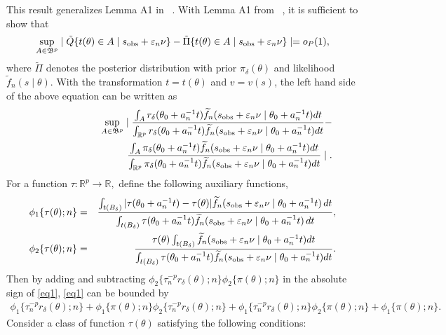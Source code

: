\documentclass[9pt]{article}
\theoremstyle{remark}
\begin{document}
	This result generalizes Lemma A1 in ~\cite{Li2017}. With Lemma A1 from ~\cite{Li2017}, it is sufficient to show that 
	\[
	\sup_{A\in\mathfrak{B}^{p}}\mid\tilde{Q}\{t(\theta)\in A\mid s_{\rm obs}+\varepsilon_{n}\nu\}-\tilde{\Pi}\{t(\theta)\in A\mid s_{\rm obs}+\varepsilon_{n}\nu\}\mid=o_{P}(1),
	\]
	where $\tilde{\Pi}$ denotes the posterior distribution with prior $\pi_{\delta}(\theta)$ and likelihood $\tilde{f}_n(s \mid \theta)$. 
With the transformation $t=t(\theta)$
	and $v=v(s)$, the left hand side of the above equation can be written
	as 
	\begin{eqnarray}
	&&\sup_{A\in\mathfrak{B}^{p}}\mid\frac{\int_{A}r_{\delta}(\theta_0+a_{n}^{-1}t)\ftil_{n}(s_{{\rm obs}}+\veps_{n}\nu\mid\theta_0+a_{n}^{-1}t)dt}{\int_{\mathbb{R}^{p}}r_{\delta}(\theta_0+a_{n}^{-1}t)\ftil_{n}(s_{{\rm obs}}+\veps_{n}\nu\mid\theta_0+a_{n}^{-1}t)dt}-\hfill  \label{eq1} \\
	&&\hspace{3cm}\frac{\int_{A}\pi_{\delta}(\theta_0+a_{n}^{-1}t)\ftil_{n}(s_{{\rm obs}}+\veps_{n}\nu\mid\theta_0+a_{n}^{-1}t)dt}{\int_{\mathbb{R}^{p}}\pi_{\delta}(\theta_0+a_{n}^{-1}t)\ftil_{n}(s_{{\rm obs}}+\veps_{n}\nu\mid\theta_0+a_{n}^{-1}t)dt}\mid. \notag 
	\end{eqnarray}
	For a function $\tau:\mathbb{R}^{p}\rightarrow\mathbb{R},$ define
	the following auxiliary functions,
	\begin{eqnarray*}
		\phi_{1}\{\tau(\theta);n\} & = & \frac{\int_{t(B_{\delta})}|\tau(\theta_0+a_{n}^{-1}t)-\tau(\theta)|\widetilde{f}_{n}(s_{{\rm obs}}+\varepsilon_{n}\nu\mid\theta_0+a_{n}^{-1}t)\,dt}{\int_{t(B_{\delta})}\tau(\theta_0+a_{n}^{-1}t)\widetilde{f}_{n}(s_{{\rm obs}}+\varepsilon_{n}\nu\mid\theta_0+a_{n}^{-1}t)\,dt},\\
		\phi_{2}\{\tau(\theta);n\} & = & \frac{\tau(\theta)\int_{t(B_{\delta})}\widetilde{f}_{n}(s_{{\rm obs}}+\varepsilon_{n}\nu\mid\theta_0+a_{n}^{-1}t)dt}{\int_{t(B_{\delta})}\tau(\theta_0+a_{n}^{-1}t)\widetilde{f}_{n}(s_{{\rm obs}}+\varepsilon_{n}\nu\mid\theta_{0}+a_{n}^{-1}t)dt}.
	\end{eqnarray*}
	Then by adding and subtracting $\phi_{2}\{\tau_{n}^{-p}r_{\delta}(\theta);n\}\phi_{2}\{\pi(\theta);n\}$
	in the absolute sign of \eqref{eq1}, \eqref{eq1} can be bounded
	by 
	\begin{eqnarray*}
		\phi_{1}\{\tau_{n}^{-p}r_{\delta}(\theta);n\}+\phi_{1}\{\pi(\theta);n\}\phi_{2}\{\tau_{n}^{-p}r_{\delta}(\theta);n\}+\phi_{1}\{\tau_{n}^{-p}r_{\delta}(\theta);n\}\phi_{2}\{\pi(\theta);n\}+\phi_{1}\{\pi(\theta);n\}.
	\end{eqnarray*}
	Consider a class of function $\tau(\theta)$ satisfying the following
	conditions: 
	
\end{document}
